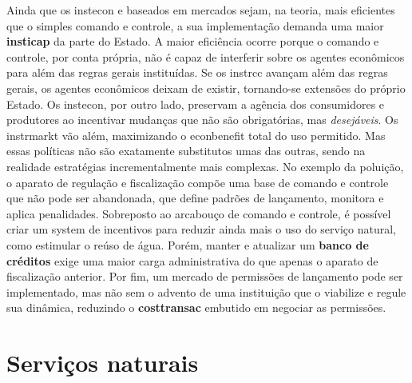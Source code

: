 \documentclass[./main.tex]{subfiles}
\begin{document}
\par Ainda que os \gls{instecon} e baseados em mercados sejam, na \gls{teoria}, mais eficientes que o simples comando e controle, a sua implementação demanda uma maior \textbf{\gls{insticap}} da parte do Estado. A maior eficiência ocorre porque o comando e controle, por conta própria, não é capaz de interferir sobre os agentes econômicos para além das regras gerais instituídas. Se os \gls{instrcc} avançam além das regras gerais, os agentes econômicos deixam de existir, tornando-se extensões do próprio Estado. Os \gls{instecon}, por outro lado, preservam a agência dos consumidores e produtores ao incentivar mudanças que não são obrigatórias, mas \textit{desejáveis}. Os \gls{instrmarkt} vão além, maximizando o \gls{econbenefit} total do uso permitido. Mas essas políticas não são exatamente substitutos umas das outras, sendo na realidade estratégias incrementalmente mais complexas. No exemplo da poluição, o aparato de regulação e fiscalização compõe uma base de comando e controle que não pode ser abandonada, que define padrões de lançamento, monitora e aplica penalidades. Sobreposto ao arcabouço de comando e controle, é possível criar um \gls{system} de incentivos para reduzir ainda mais o uso do serviço natural, como estimular o reúso de água. Porém, manter e atualizar um \textbf{banco de créditos} exige uma maior carga administrativa do que apenas o aparato de fiscalização anterior. Por fim, um mercado de permissões de lançamento pode ser implementado, mas não sem o advento de uma instituição que o viabilize e regule sua dinâmica, reduzindo o \textbf{\gls{costtransac}} embutido em negociar as permissões.

\section{Serviços naturais} \label{chap:ecoeco:natserv}
\end{document}
